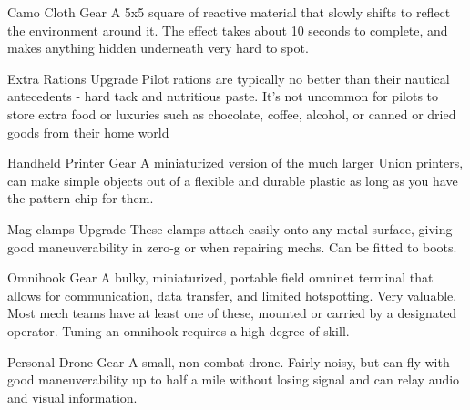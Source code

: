 Camo Cloth                    Gear           A 5x5 square of reactive material that slowly shifts to reflect the  
                                             environment around it. The effect takes about 10 seconds to  
                                             complete, and makes anything hidden underneath very hard to  
                                             spot. 

Extra Rations                 Upgrade        Pilot rations are typically no better than their nautical antecedents  
                                             - hard tack and nutritious paste. It’s not uncommon for pilots to  
                                             store extra food or luxuries such as chocolate, coffee, alcohol, or  
                                             canned or dried goods from their home world 

Handheld Printer              Gear           A miniaturized version of the much larger Union printers, can  
                                             make simple objects out of a flexible and durable plastic as long  
                                             as you have the pattern chip for them. 

Mag-clamps                    Upgrade        These clamps attach easily onto any metal surface, giving good  
                                             maneuverability in zero-g or when repairing mechs. Can be fitted  
                                             to boots. 

                                                                                                                        


Omnihook                      Gear           A bulky, miniaturized, portable field omninet terminal that allows  
                                             for communication, data transfer, and limited hotspotting. Very  
                                             valuable. Most mech teams have at least one of these, mounted  
                                             or carried by a designated operator. Tuning an omnihook requires  
                                             a high degree of skill. 

Personal Drone                Gear           A small, non-combat drone. Fairly noisy, but can fly with good  
                                             maneuverability up to half a mile without losing signal and can  
                                             relay audio and visual information. 

